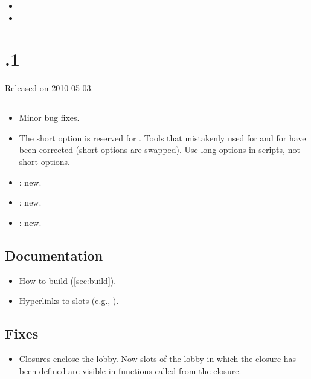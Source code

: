 \begin{itemize}
\item {}
\item {}
\end{itemize}

\section{.1}
Released on 2010-05-03.

\subsection{\us}
\begin{itemize}
\item Minor bug fixes.
\item The short option  is reserved for .
  Tools that mistakenly used  for  and
   for  have been corrected (short options are
  swapped).  Use long options in scripts, not short options.
\item {}: new.
\item {}: new.
\item {}: new.
\end{itemize}

\subsection{Documentation}

\begin{itemize}
\item How to build \usdk (\autoref{sec:build}).
\item Hyperlinks to slots (e.g., ).
\end{itemize}

\subsection{Fixes}
\begin{itemize}
\item Closures enclose the lobby.  Now slots of the lobby in which the
  closure has been defined are visible in functions called from the closure.
\end{itemize}

\section{}


